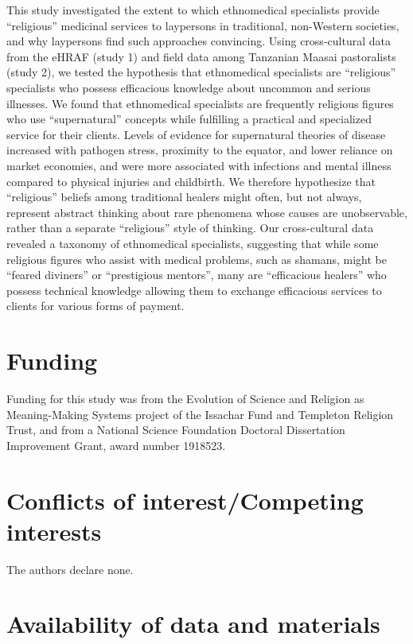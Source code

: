 \documentclass[
  11pt,
]{article}
\begin{document}
This study investigated the extent to which ethnomedical specialists provide ``religious'' medicinal services to laypersons in traditional, non-Western societies, and why laypersons find such approaches convincing. Using cross-cultural data from the eHRAF (study 1) and field data among Tanzanian Maasai pastoralists (study 2), we tested the hypothesis that ethnomedical specialists are ``religious'' specialists who possess efficacious knowledge about uncommon and serious illnesses. We found that ethnomedical specialists are frequently religious figures who use ``supernatural'' concepts while fulfilling a practical and specialized service for their clients. Levels of evidence for supernatural theories of disease increased with pathogen stress, proximity to the equator, and lower reliance on market economies, and were more associated with infections and mental illness compared to physical injuries and childbirth. We therefore hypothesize that ``religious'' beliefs among traditional healers might often, but not always, represent abstract thinking about rare phenomena whose causes are unobservable, rather than a separate ``religious'' style of thinking. Our cross-cultural data revealed a taxonomy of ethnomedical specialists, suggesting that while some religious figures who assist with medical problems, such as shamans, might be ``feared diviners'' or ``prestigious mentors'', many are ``efficacious healers'' who possess technical knowledge allowing them to exchange efficacious services to clients for various forms of payment.

\hypertarget{funding}{%
\section{Funding}\label{funding}}

Funding for this study was from the Evolution of Science and Religion as Meaning-Making Systems project of the Issachar Fund and Templeton Religion Trust, and from a National Science Foundation Doctoral Dissertation Improvement Grant, award number 1918523.

\hypertarget{conflicts-of-interestcompeting-interests}{%
\section{Conflicts of interest/Competing interests}\label{conflicts-of-interestcompeting-interests}}

The authors declare none.

\hypertarget{availability-of-data-and-materials}{%
\section{Availability of data and materials}\label{availability-of-data-and-materials}}
\end{document}
